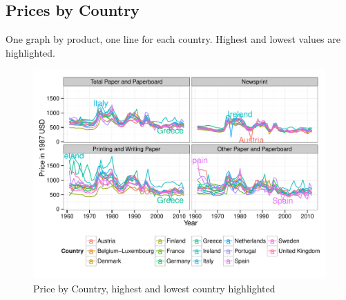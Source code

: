 \documentclass{scrartcl}\usepackage{graphicx, color}
\newenvironment{knitrout}{}{} %
\begin{document}
\subsection{Prices by Country }
One graph by product, one line for each country. 
Highest and lowest values are highlighted. 
\begin{knitrout}
\color{fgcolor}\begin{figure}[h]


{\centering \includegraphics[width=1\linewidth]{figure/PriceByCountry} 

}

\caption[Price by Country, highest and lowest country highlighted]{Price by Country, highest and lowest country highlighted\label{fig:PriceByCountry}}
\end{figure}


\end{knitrout}


\newpage
\end{document}
